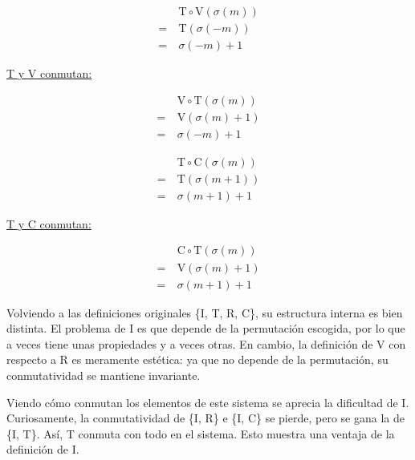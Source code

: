 \begin{center}
			\begin{multicols}{3}
				\begin{align*}
				&\ \text{T}\circ\text{V}(\sigma(m))\\
				=&\ \text{T}(\sigma(-m))\\
				=&\ \sigma(-m)+1
				\end{align*}
				
				\underline{T y V conmutan:}
				
				\begin{align*}
				&\ \text{V}\circ\text{T}(\sigma(m))\\
				=&\ \text{V}(\sigma(m)+1)\\
				=&\ \sigma(-m)+1
				\end{align*}
			\end{multicols}
			
			\begin{multicols}{3}
				\begin{align*}
				&\ \text{T}\circ\text{C}(\sigma(m))\\
				=&\ \text{T}(\sigma(m+1))\\
				=&\ \sigma(m+1)+1
				\end{align*}
				
				\underline{T y C conmutan:}
				
				\begin{align*}
				&\ \text{C}\circ\text{T}(\sigma(m))\\
				=&\ \text{V}(\sigma(m)+1)\\
				=&\ \sigma(m+1)+1
				\end{align*}
			\end{multicols}
		\end{center}
		
		Volviendo a las definiciones originales \{I, T, R, C\}, su estructura interna es bien distinta. El problema de I es que depende de la permutaci\'on escogida, por lo que a veces tiene unas propiedades y a veces otras. En cambio, la definici\'on de V con respecto a R es meramente est\'etica: ya que no depende de la permutaci\'on, su conmutatividad se mantiene invariante. 
		
		Viendo c\'omo conmutan los elementos de este sistema se aprecia la dificultad de I. Curiosamente, la conmutatividad de \{I, R\} e \{I, C\} se pierde, pero se gana la de \{I, T\}. As\'i, T conmuta con todo en el sistema. Esto muestra una ventaja de la definici\'on de I.
		
